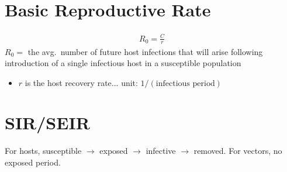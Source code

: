 \documentclass{article}
\begin{document}
    \section{Basic Reproductive Rate}
        \begin{align}
            R_0 = \frac{C}{r}
        \end{align}
        $R_0 = $ the avg.~number of future host infections that will arise following introduction of a single infectious host in a susceptible population
        \begin{itemize}
            \item $r$ is the host recovery rate... unit: $1/(\text{infectious period})$
        \end{itemize}

    \section{SIR/SEIR}
        For hosts, susceptible $\rightarrow$ exposed $\rightarrow$ infective $\rightarrow$ removed.  For vectors, no exposed period.
\end{document}
